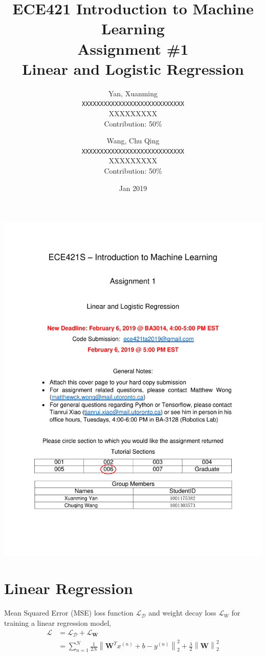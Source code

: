 \documentclass[10pt,letterpaper]{article}
\title{ECE421 Introduction to Machine Learning \\
    Assignment \#1 \\
    Linear and Logistic Regression}
\date{Jan 2019}
\author{
  Yan, Xuanming\\
  \texttt{XXXXXXXXXXXXXXXXXXXXXXXXXXXX} \\
  XXXXXXXXX \\
  Contribution: 50\%
  \and
  Wang, Chu Qing\\
  \texttt{XXXXXXXXXXXXXXXXXXXXXXXXXXXX} \\
  XXXXXXXXX \\
  Contribution: 50\%
} %
\begin{document}
\includegraphics[width=0.95\linewidth]{a1cover.pdf}
% 

\maketitle %


\section{Linear Regression}
\qquad Mean Squared Error (MSE) loss function $\mathcal{L}_{\mathcal{D}}$ and weight decay loss $\mathcal{L}_{W}$ for training a linear regression model, 
\begin{align*}
    \mathcal{L} &= \mathcal{L}_{\mathcal{D}} + \mathcal{L}_{\textbf{W}} \\
    &= \sum_{n=1}^{N}\frac{1}{2N}\left\| \textbf{W}^{T}x^{(n)} + b - y^{(n)} \right\|^{2}_{2} + \frac{\lambda}{2} \left\| \textbf{W} \right\|^{2}_{2}
\end{align*}
\end{document}
